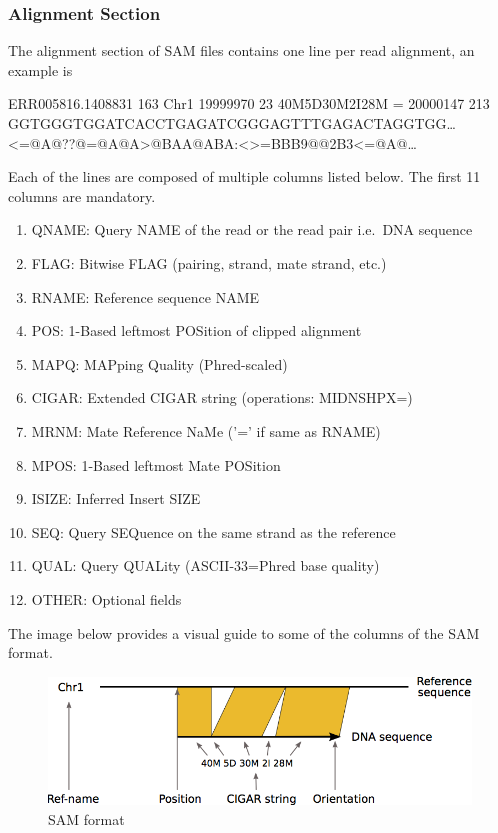 \documentclass[11pt]{article}
\providecommand{\tightlist}{%
      \setlength{\itemsep}{0pt}\setlength{\parskip}{0pt}}
\begin{document}
    \hypertarget{alignment-section}{%
\subsubsection{Alignment Section}\label{alignment-section}}

The alignment section of SAM files contains one line per read alignment,
an example is

ERR005816.1408831 163 Chr1 19999970 23 40M5D30M2I28M = 20000147 213
GGTGGGTGGATCACCTGAGATCGGGAGTTTGAGACTAGGTGG\ldots{}\\
\textless=@A@??@=@A@A\textgreater{}@BAA@ABA:\textgreater@\textless\textgreater=BBB9@@2B3\textless=@A@\ldots{}

Each of the lines are composed of multiple columns listed below. The
first 11 columns are mandatory.

\begin{enumerate}
\def\labelenumi{\arabic{enumi}.}
\tightlist
\item
  QNAME: Query NAME of the read or the read pair i.e.~DNA sequence
\item
  FLAG: Bitwise FLAG (pairing, strand, mate strand, etc.)
\item
  RNAME: Reference sequence NAME
\item
  POS: 1-Based leftmost POSition of clipped alignment
\item
  MAPQ: MAPping Quality (Phred-scaled)
\item
  CIGAR: Extended CIGAR string (operations: MIDNSHPX=)
\item
  MRNM: Mate Reference NaMe ('=' if same as RNAME)
\item
  MPOS: 1-Based leftmost Mate POSition
\item
  ISIZE: Inferred Insert SIZE
\item
  SEQ: Query SEQuence on the same strand as the reference
\item
  QUAL: Query QUALity (ASCII-33=Phred base quality)
\item
  OTHER: Optional fields
\end{enumerate}

The image below provides a visual guide to some of the columns of the
SAM format.

    \begin{figure}[!h]
\centering
\includegraphics{img/SAM_BAM.png}
\caption{SAM format}
\end{figure}
\end{document}

